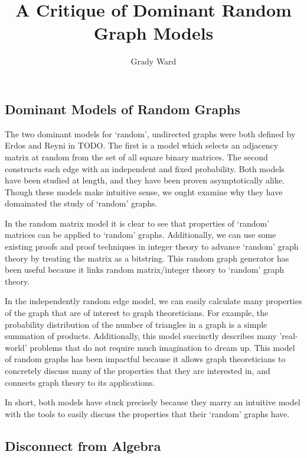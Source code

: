 \documentclass[a4paper,12pt]{article}
\begin{document}
\lstset{language=Python}

\title{A Critique of Dominant Random Graph Models}

\author{Grady Ward}

\maketitle

\subsection*{Dominant Models of Random Graphs}

The two dominant models for `random', undirected graphs were both defined by Erdos and Reyni in TODO.
The first is a model which selects an adjacency matrix at random from the set of all square binary matrices.
The second constructs each edge with an independent and fixed probability. 
Both models have been studied at length, and they have been proven asymptotically alike. 
Though these models make intuitive sense, we ought examine why they have domainated the study of `random' graphs.

In the random matrix model it is clear to see that properties of `random' matrices can be applied to `random' graphs.
Additionally, we can use some existing proofs and proof techniques in integer theory to advance `random' graph theory by treating the matrix as a bitstring. 
This random graph generator has been useful because it links random matrix/integer theory to `random' graph theory.

In the independently random edge model, we can easily calculate many properties of the graph that are of interest to graph theoreticians.
For example, the probability distribution of the number of triangles in a graph is a simple summation of products.
Additionally, this model succinctly describes many 'real-world' problems that do not require much imagination to dream up.
This model of random graphs has been impactful because it allows graph theoreticians to concretely discuss many of the properties that they are interested in, and connects graph theory to its applications.

In short, both models have stuck precisely because they marry an intuitive model with the tools to easily discuss the properties that their `random' graphs have.

\subsection*{Disconnect from Algebra}
\end{document}
